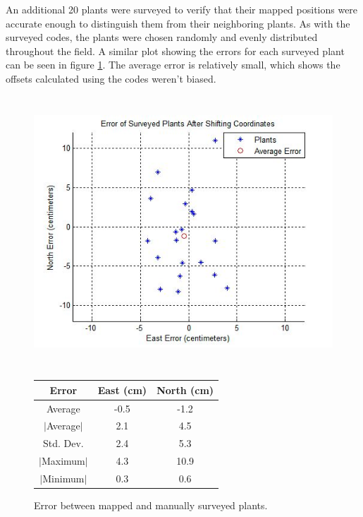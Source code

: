An additional 20 plants were surveyed to verify that their mapped positions were accurate enough to distinguish them from their neighboring plants.  As with the surveyed codes, the plants were chosen randomly and evenly distributed throughout the field.   A similar plot showing the errors for each surveyed plant can be seen in figure \ref{figure:plant_errors}.  The average error is relatively small, which shows the offsets calculated using the codes weren't biased.   

  \begin{figure}
	\centering
    \includegraphics[height=4in]{figures/plant_errors.jpg}
    \label{figure:plant_errors}
    \newline
    \newline
    \centering
    \begin{tabular}[c]{|c|c|c|}
        \hline
        Error & East (cm) & North (cm) \\ 
        \hline
        Average   & -0.5 & -1.2           \\
        $|$Average$|$ & 2.1 & 4.5       \\
        Std. Dev. & 2.4 & 5.3       \\
        $|$Maximum$|$   & 4.3 & 10.9       \\
        $|$Minimum$|$   & 0.3 & 0.6       \\
        \hline
    \end{tabular}
    \captionsetup{labelformat=andtable}
    \caption{Error between mapped and manually surveyed plants.}
  \end{figure}

